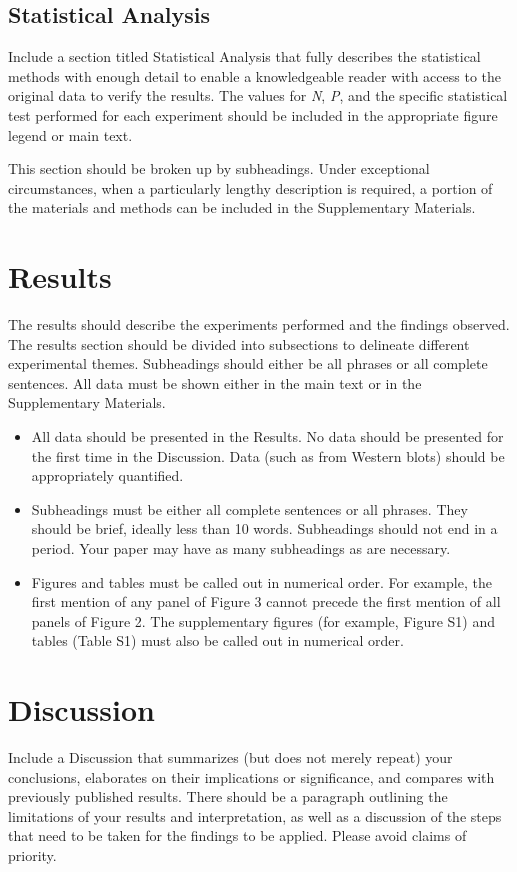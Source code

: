\documentclass{article}
\begin{document}
\subsection{Statistical Analysis}
Include a section titled Statistical Analysis that fully describes the statistical methods with enough detail to enable a knowledgeable reader with access to the original data to verify the results. The values for \textit{N}, \textit{P}, and the specific statistical test performed for each experiment should be included in the appropriate figure legend or main text. 

This section should be broken up by subheadings. Under exceptional circumstances, when a particularly lengthy description is required, a portion of the materials and methods can be included in the Supplementary Materials. 

\section{Results}
The results should describe the experiments performed and the findings observed. The results section should be divided into subsections to delineate different experimental themes. Subheadings should either be all phrases or all complete sentences. All data must be shown either in the main text or in the Supplementary Materials.
\begin{itemize}
    \item All data should be presented in the Results. No data should be presented for the first time in the Discussion. Data (such as from Western blots) should be appropriately quantified.
    \item Subheadings must be either all complete sentences or all phrases. They should be brief, ideally less than 10 words. Subheadings should not end in a period. Your paper may have as many subheadings as are necessary.
    \item Figures and tables must be called out in numerical order. For example, the first mention of any panel of Figure 3 cannot precede the first mention of all panels of Figure 2. The supplementary figures (for example, Figure S1) and tables (Table S1) must also be called out in numerical order.
\end{itemize}

\section{Discussion}
Include a Discussion that summarizes (but does not merely repeat) your conclusions, elaborates on their implications or significance, and compares with previously published results. There should be a paragraph outlining the limitations of your results and interpretation, as well as a discussion of the steps that need to be taken for the findings to be applied. Please avoid claims of priority. 
\end{document}
